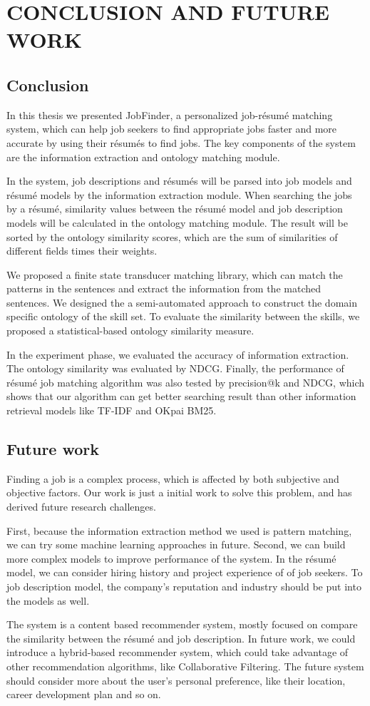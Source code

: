 \chapter{CONCLUSION AND FUTURE WORK}

\section{Conclusion}
In this thesis we presented JobFinder, a personalized job-r\'esum\'e matching system, which can help job seekers to find appropriate jobs faster and more accurate by using their r\'esum\'es to find jobs. The key components of the system are the information extraction and ontology matching module.

In the system, job descriptions and r\'esum\'es will be parsed into job models and r\'esum\'e models by the information extraction module. When searching the jobs by a r\'esum\'e, similarity values between the r\'esum\'e model and job description models will be calculated in the ontology matching module. The result will be sorted by the ontology similarity scores, which are the sum of similarities of different fields times their weights.

We proposed a finite state transducer matching library, which can match the patterns in the sentences and extract the information from the matched sentences. We designed the a semi-automated approach to construct the domain specific ontology of the skill set. To evaluate the similarity between the skills, we proposed a statistical-based ontology similarity measure.

In the experiment phase, we evaluated the accuracy of information extraction. The ontology similarity was evaluated by NDCG. Finally, the performance of r\'esum\'e job matching algorithm was also tested by precision@k and NDCG,  which shows that our algorithm can get better searching result than other information retrieval models like TF-IDF and OKpai BM25.


\section{Future work}

Finding a job is a complex process, which is affected by both subjective and objective factors.  Our work is just a initial work to solve this problem, and has derived future research challenges.

First, because the information extraction method we used is pattern matching, we can try some machine learning approaches in future. Second, we can build more complex models to improve performance of the system. In the r\'esum\'e model, we can consider hiring history and project experience of of job seekers. To job description model, the company's reputation and industry should be put into the models as well.

The system is a content based recommender system, mostly focused on compare the similarity between the r\'esum\'e and job description. In future work, we could introduce a hybrid-based recommender system, which could take advantage of other recommendation algorithms, like Collaborative Filtering. The future system should consider more about the user's personal preference, like their location, career development plan and so on.
